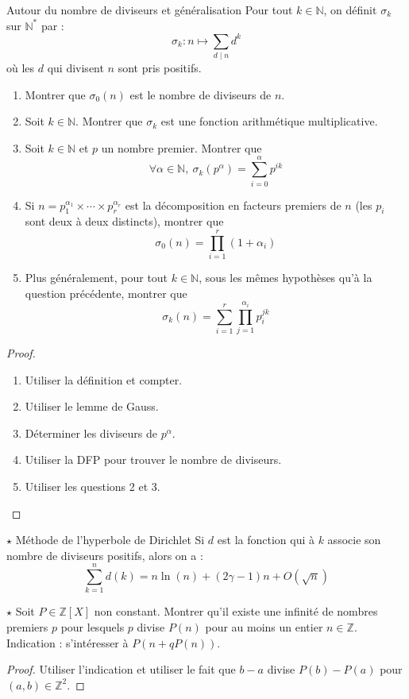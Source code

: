 \documentclass[french,a4paper]{article}
\newcommand{\N}{\mathbb{N}}
\newcommand{\Z}{\mathbb{Z}}
\newcommand{\st}{^*}
\theoremstyle{plain}
\theoremstyle{definition}
\theoremstyle{remark}
\begin{document}
\begin{ex}{Autour du nombre de diviseurs et généralisation}
	Pour tout $k\in\N$, on définit $\sigma_k$ sur $\N\st$ par : $$\sigma_k:n\mapsto\sum_{d\mid n}d^k$$ où les $d$ qui divisent $n$ sont pris positifs.
	\begin{enumerate}
		\item Montrer que $\sigma_0(n)$ est le nombre de diviseurs de $n$.
		\item Soit $k\in\N$. Montrer que $\sigma_k$ est une fonction arithmétique multiplicative.
		\item Soit $k\in\N$ et $p$ un nombre premier. Montrer que $$\forall\alpha\in\N,\ \sigma_k(p^\alpha)=\sum_{i=0}^{\alpha}p^{ik}$$
		\item Si $n=p_1^{\alpha_1}\times\cdots\times p_r^{\alpha_r}$ est la décomposition en facteurs premiers de $n$ (les $p_i$ sont deux à deux distincts), montrer que $$\sigma_0(n)=\prod_{i=1}^{r}(1+\alpha_i)$$
		\item Plus généralement, pour tout $k\in\N$, sous les mêmes hypothèses qu'à la question précédente, montrer que $$\sigma_k(n)=\sum_{i=1}^{r}\prod_{j=1}^{\alpha_i}p_i^{jk}$$
	\end{enumerate}
\end{ex}
\begin{proof}
	\begin{enumerate}
		\item Utiliser la définition et compter.
		\item Utiliser le lemme de Gauss.
		\item Déterminer les diviseurs de $p^\alpha$.
		\item Utiliser la DFP pour trouver le nombre de diviseurs.
		\item Utiliser les questions 2 et 3.
	\end{enumerate}
\end{proof}

\begin{ex}{$\star$ Méthode de l'hyperbole de Dirichlet}
	Si $d$ est la fonction qui à $k$ associe son nombre de diviseurs positifs, alors on a : $$\sum_{k=1}^{n}d(k)=n\ln(n)+(2\gamma-1)n+O(\sqrt{n})$$
\end{ex}

\begin{ex}{$\star$}
	Soit $P\in\Z[X]$ non constant. Montrer qu'il existe une infinité de nombres premiers $p$ pour lesquels $p$ divise $P(n)$ pour au moins un entier $n\in\Z$. Indication : s'intéresser à $P(n+qP(n))$.
\end{ex}
\begin{proof}
	Utiliser l'indication et utiliser le fait que $b-a$ divise $P(b)-P(a)$ pour $(a,b)\in\Z^2$.
\end{proof}
\end{document}
